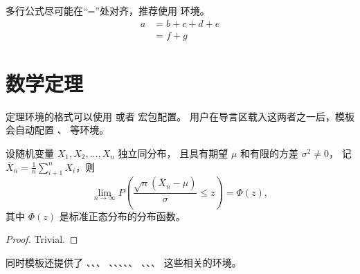 多行公式尽可能在“=”处对齐，推荐使用  环境。
\begin{align}
  a & = b + c + d + e \\
    & = f + g
\end{align}



\section{数学定理}

定理环境的格式可以使用  或者  宏包配置。
用户在导言区载入这两者之一后，模板会自动配置 、 等环境。

\begin{theorem}
  设随机变量 $X_1, X_2, \dots, X_n$ 独立同分布， 且具有期望 $\mu$ 和有限的方差 $\sigma^2 \ne 0$，
  记 $\bar{X}_n = \frac{1}{n} \sum_{i+1}^n X_i$，则
  \begin{equation}
    \lim_{n \to \infty} P \left(\frac{\sqrt{n} \left( \bar{X}_n - \mu \right)}{\sigma} \le z \right) = \Phi(z),
  \end{equation}
  其中 $\Phi(z)$ 是标准正态分布的分布函数。
\end{theorem}
\begin{proof}
  Trivial.
\end{proof}

同时模板还提供了 、、、
、、、、、
、、、 这些相关的环境。
